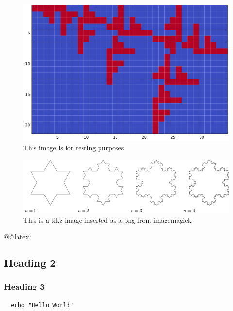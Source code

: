 \documentclass[11pt]{article}
\begin{document}
\begin{figure}[htbp]
\centering
\includegraphics[width=12cm]{media/my-self-rep-frac.png}
\caption{\label{testim}This image is for testing purposes \cite{moskowitzLibraryGuidesWikipedia}}
\end{figure}

\begin{figure}[htbp]
\centering
\includegraphics[width=12cm]{media/tikz/Snowflake.png}
\caption{\label{testtikzins}This is a tikz image inserted as a png from imagemagick}
\end{figure}


@@latex: 



\subsection{Heading 2}
\label{heading-2}
\subsubsection{Heading 3}
\label{heading-3}
\lstset{language=sh,label= ,caption= ,captionpos=b,numbers=none}
\begin{lstlisting}
  echo "Hello World"
\end{lstlisting}
\end{document}
